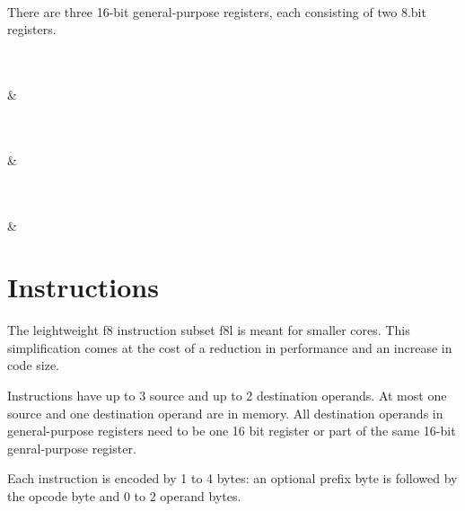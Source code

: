 \documentclass{book}
\begin{document}
\vspace{3mm}
\begin{bytefield}[bitwidth=0.025\linewidth]{16}
	 \\
\end{bytefield}

There are three 16-bit general-purpose registers, each consisting of two 8.bit registers.

\vspace{3mm}
\begin{bytefield}[bitwidth=0.025\linewidth]{16}
	 \\
	 \\
	 &
\end{bytefield}

\vspace{3mm}
\begin{bytefield}[bitwidth=0.025\linewidth]{16}
	 \\
	 \\
	 &
\end{bytefield}

\vspace{3mm}
\begin{bytefield}[bitwidth=0.025\linewidth]{16}
	 \\
	 \\
	 &
\end{bytefield}

\section{Instructions}

The leightweight f8 instruction subset f8l is meant for smaller cores. This simplification comes at the cost of a reduction in performance and an increase in code size.

Instructions have up to 3 source and up to 2 destination operands. At most one source and one destination operand are in memory. All destination operands in general-purpose registers need to be one 16 bit register or part of the same 16-bit genral-purpose register.

Each instruction is encoded by 1 to 4 bytes: an optional prefix byte is followed by the opcode byte and 0 to 2 operand bytes.
\end{document}
